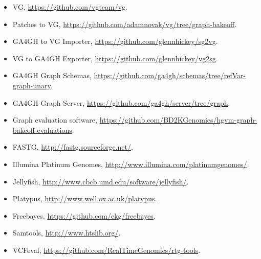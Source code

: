 \begin{itemize}
\item[] VG, \href{https://github.com/vgteam/vg}{https://github.com/vgteam/vg}.

\item[] Patches to VG,
\href{https://github.com/adamnovak/vg/tree/graph-bakeoff}{https://github.com/adamnovak/vg/tree/graph-bakeoff}.

\item[] GA4GH to VG Importer,
\href{https://github.com/glennhickey/sg2vg}{https://github.com/glennhickey/sg2vg}.

\item[] VG to GA4GH Exporter,
\href{https://github.com/glennhickey/vg2sg}{https://github.com/glennhickey/vg2sg}.

\item[] GA4GH Graph Schemas,
\href{https://github.com/ga4gh/schemas/tree/refVar-graph-unary}{https://github.com/ga4gh/schemas/tree/refVar-graph-unary}.

\item[] GA4GH Graph Server,
\href{https://github.com/ga4gh/server/tree/graph}{https://github.com/ga4gh/server/tree/graph}.

\item[] Graph evaluation software,
\href{https://github.com/BD2KGenomics/hgvm-graph-bakeoff-evaluations}{https://github.com/BD2KGenomics/hgvm-graph-bakeoff-evaluations}.

\item[] FASTG,
\href{http://fastg.sourceforge.net/}{http://fastg.sourceforge.net/}.

\item[] Illumina Platinum Genomes,
\href{http://www.illumina.com/platinumgenomes/}{http://www.illumina.com/platinumgenomes/}.

\item[] Jellyfish,
\href{http://www.cbcb.umd.edu/software/jellyfish/}{http://www.cbcb.umd.edu/software/jellyfish/}.

\item[] Platypus,
\href{http://www.well.ox.ac.uk/platypus}{http://www.well.ox.ac.uk/platypus}.

\item[] Freebayes,
\href{https://github.com/ekg/freebayes}{https://github.com/ekg/freebayes}.

\item[] Samtools, \href{http://www.htslib.org/}{http://www.htslib.org/}.

\item[] VCFeval,
\href{https://github.com/RealTimeGenomics/rtg-tools}{https://github.com/RealTimeGenomics/rtg-tools}.
\end{itemize}

